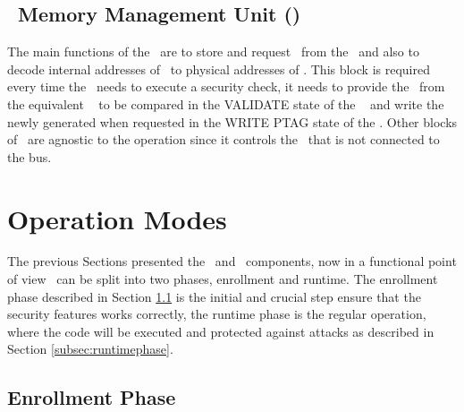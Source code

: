 \subsection{\ptag~Memory Management Unit (\pmmu)}
\label{subsec:pmmu}
The main functions of the \pmmu~are to store and request \ptags~from the \ptagmem~and also to decode internal addresses of \ptags~to physical addresses of \ptagmem. This block is required every time the \handler~needs to execute a security check, it needs to provide the \ptag ~from the equivalent \slines~ to be compared in the VALIDATE state of the \seceng~ and write the newly generated \ptags when requested in the WRITE PTAG state of the \seceng.  Other blocks of \cshia~are agnostic to the \pmmu operation since it controls the \ptagmem~that is not connected to the bus.


\section{Operation Modes}
\label{sec:opmodes}


The previous Sections presented the \cshia~and \amba~components, now in a functional point of view \cshia~can be split into two phases, enrollment and runtime. The enrollment phase described in Section \ref{subsec:Enrollment-Phase}  is the initial and crucial step ensure that the security features works correctly, the runtime phase is the regular operation, where the code will be executed and protected against attacks as described in Section \ref{subsec:runtimephase}.



\def\fenroll{Figure \ref{fig:fuzzy-extractor} \subref{fig:fuzzy-enroll}}
\def\fregen{Figure \ref{fig:fuzzy-extractor} \subref{fig:fuzzy-regen}}
\subsection{Enrollment Phase}
\label{subsec:Enrollment-Phase}

